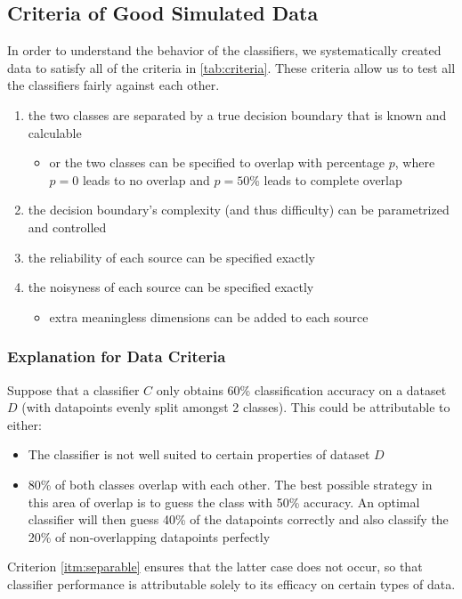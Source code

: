 \documentclass{article}
\begin{document}
\subsection{Criteria of Good Simulated Data}

In order to understand the behavior of the classifiers, we systematically
created data to satisfy all of the criteria in \ref{tab:criteria}.
These criteria allow us to test all the classifiers fairly against each other.

\begin{minipage}{\textwidth}
\centering
\begin{enumerate}
    \item \label{itm:separable} the two classes are separated by a true
        decision boundary that is known and calculable
    \begin{itemize}
        \item or the two classes can be specified to overlap with percentage
            $p$, where $p=0$ leads to no overlap and $p=50$\% leads to complete
            overlap
    \end{itemize}
    \item the decision boundary's complexity (and thus difficulty) can be
        parametrized and controlled
    \item the reliability of each source can be specified exactly
    \item the noisyness of each source can be specified exactly
    \begin{itemize}
        \item \label{itm:noise_dims} extra meaningless dimensions can be
            added to each source
    \end{itemize}
\end{enumerate}
\label{tab:criteria}
\end{minipage}

\subsubsection{Explanation for Data Criteria}

Suppose that a classifier $C$ only obtains 60\% classification accuracy on a
dataset $D$ (with datapoints evenly split amongst 2 classes). This could be
attributable to either:
\begin{itemize}
    \item The classifier is not well suited to certain properties of dataset $D$
    \item 80\% of both classes overlap with each other. The best possible
        strategy in this area of overlap is to guess the class with 50\%
        accuracy. An optimal classifier will then guess 40\% of the datapoints
        correctly and also classify the 20\% of non-overlapping datapoints
        perfectly
\end{itemize}
Criterion \ref{itm:separable} ensures that the latter case does not occur,
so that classifier performance is attributable solely to its efficacy on
certain types of data.
\end{document}
